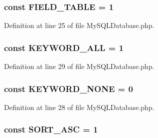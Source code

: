 \subsubsection[{F\+I\+E\+L\+D\+\_\+\+T\+A\+B\+L\+E}]{\setlength{\rightskip}{0pt plus 5cm}const F\+I\+E\+L\+D\+\_\+\+T\+A\+B\+L\+E = 1}\label{class_my_s_q_l_database_acbdf154a35cfc228dd1016e8aa4bd503}


Definition at line 25 of file My\+S\+Q\+L\+Database.\+php.

\hypertarget{class_my_s_q_l_database_ababb5c4af464938f3f0b8f9c4fa183ba}{}
\subsubsection[{K\+E\+Y\+W\+O\+R\+D\+\_\+\+A\+L\+L}]{\setlength{\rightskip}{0pt plus 5cm}const K\+E\+Y\+W\+O\+R\+D\+\_\+\+A\+L\+L = 1}\label{class_my_s_q_l_database_ababb5c4af464938f3f0b8f9c4fa183ba}


Definition at line 29 of file My\+S\+Q\+L\+Database.\+php.

\hypertarget{class_my_s_q_l_database_a9b1a24ef01d468c146a71b333edb0c17}{}
\subsubsection[{K\+E\+Y\+W\+O\+R\+D\+\_\+\+N\+O\+N\+E}]{\setlength{\rightskip}{0pt plus 5cm}const K\+E\+Y\+W\+O\+R\+D\+\_\+\+N\+O\+N\+E = 0}\label{class_my_s_q_l_database_a9b1a24ef01d468c146a71b333edb0c17}


Definition at line 28 of file My\+S\+Q\+L\+Database.\+php.

\hypertarget{class_my_s_q_l_database_a9517f2622dfc5fbb0cc64feef247eb06}{}
\subsubsection[{S\+O\+R\+T\+\_\+\+A\+S\+C}]{\setlength{\rightskip}{0pt plus 5cm}const S\+O\+R\+T\+\_\+\+A\+S\+C = 1}\label{class_my_s_q_l_database_a9517f2622dfc5fbb0cc64feef247eb06}


